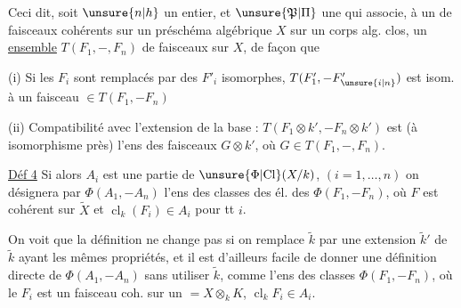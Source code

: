 Ceci dit, soit $\unsure{n|h}$ un entier, et $\unsure{\mathfrak P|\Pi}$ une  qui associe, à un  de faisceaux cohérents sur un préschéma algébrique $X$ sur un corps  alg. clos,
un \uline{ensemble} $T(F_1,-,F_n)$ de  faisceaux  sur $X$, de façon que

(i) Si les $F_i$ sont remplacés par des $F'_i$ isomorphes,  $T(F'_1,-F'_{\unsure{i|n}})$ est isom. à  un faisceau $\in T(F_1,-F_n)$

(ii) Compatibilité avec l'extension de la base : $T(F_1\otimes k',-F_n\otimes k')$ est (à isomorphisme près) l'ens des faisceaux $G\otimes k'$, où $G\in T(F_1,-,F_n)$.

\uline{Déf 4} Si alors $A_i$ est une partie de $\unsure{\Phi|\mathrm{Cl}}(X/k)$, $(i=1,\ldots,n)$ on désignera par $\Phi(A_1,-A_n)$ l'ens des classes  des él. des $\Phi(F_1,-F_n)$, où $F$ est cohérent sur $\widetilde X$ et $\operatorname{cl}_k(F_i)\in A_i$ pour tt $i$.

On voit  que la définition ne change pas si on remplace $\widetilde k$ par une extension $\widetilde k'$ de $\widetilde k$ ayant les mêmes propriétés, et il est d'ailleurs facile de donner une définition directe de $\Phi(A_1,-A_n)$ sans utiliser $\widetilde k$, comme l'ens des classes
$\Phi(F_1,-F_n)$, où le $F_i$ est un faisceau coh. sur un $=X\otimes_kK$,  $\operatorname{cl}_kF_i\in A_i$.

